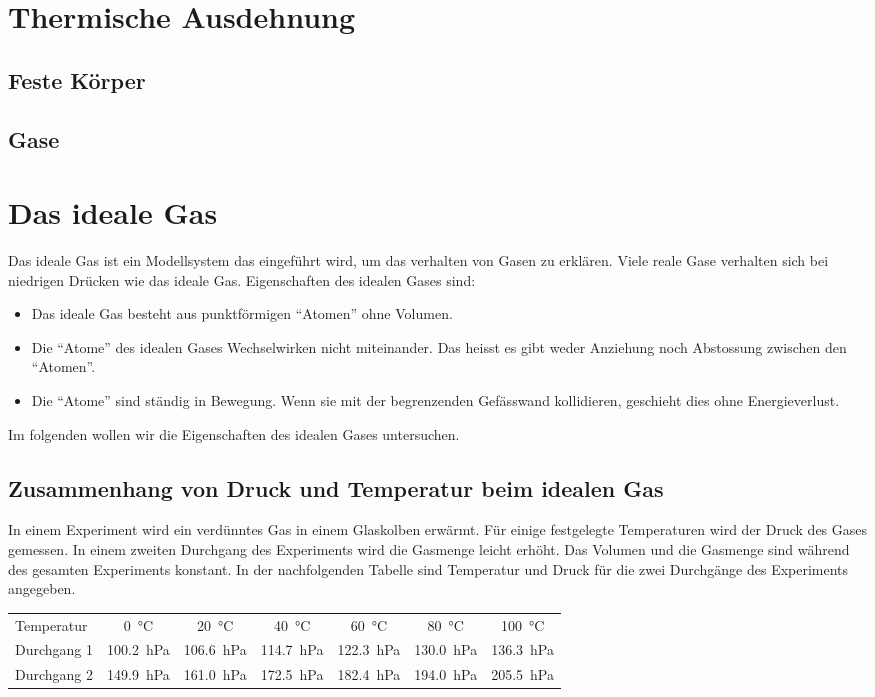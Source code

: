 \documentclass[12pt,a4paper,twoside]{article}
\begin{document}
\section*{Thermische Ausdehnung}
\subsection*{Feste Körper}
\subsection*{Gase}
\section{Das ideale Gas}
Das ideale Gas ist ein Modellsystem das eingeführt wird, um das verhalten von Gasen zu erklären.
Viele reale Gase verhalten sich bei niedrigen Drücken wie das ideale Gas.
Eigenschaften des idealen Gases sind:
\begin{itemize}
	\item Das ideale Gas besteht aus punktförmigen ``Atomen'' ohne Volumen.
	\item Die ``Atome'' des idealen Gases Wechselwirken nicht miteinander. 
		Das heisst es gibt weder Anziehung noch Abstossung zwischen den ``Atomen''.
	\item Die ``Atome'' sind ständig in Bewegung. Wenn sie mit der begrenzenden Gefässwand kollidieren, 
		geschieht dies ohne Energieverlust.
\end{itemize}

Im folgenden wollen wir die Eigenschaften des idealen Gases untersuchen.

\subsection{Zusammenhang von Druck und Temperatur beim idealen Gas}
In einem Experiment wird ein verdünntes Gas in einem Glaskolben erwärmt.
Für einige festgelegte Temperaturen wird der Druck des Gases gemessen.
In einem zweiten Durchgang des Experiments wird die Gasmenge leicht erhöht.
Das Volumen und die Gasmenge sind während des gesamten Experiments konstant.
In der nachfolgenden Tabelle sind Temperatur und Druck für die zwei Durchgänge des Experiments angegeben.

\begin{center}
\begin{tabular}{lcccccc}
Temperatur &		\SI{0}{\celsius} & \SI{20}{\celsius} & \SI{40}{\celsius} & \SI{60}{\celsius} & \SI{80}{\celsius} & \SI{100}{\celsius}\\
Durchgang 1 &  \SI{100.2}{hPa}         & \SI{106.6}{hPa}   & \SI{114.7}{hPa}   & \SI{122.3}{hPa}   & \SI{130.0}{hPa}   & \SI{136.3}{hPa}\\
Durchgang 2 &  \SI{149.9}{hPa}	     & \SI{161.0}{hPa}   & \SI{172.5}{hPa}   & \SI{182.4}{hPa}   & \SI{194.0}{hPa}   & \SI{205.5}{hPa}\\
\end{tabular}
\end{center}
\end{document}
